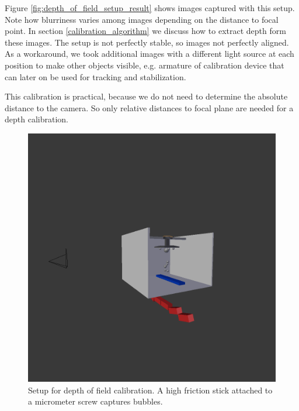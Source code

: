 			Figure \ref{fig:depth_of_field_setup_result} shows images captured with this setup. Note how blurriness varies among images depending on the distance to focal point. In section \ref{calibration_algorithm} we discuss how to extract depth form these images. The setup is not perfectly stable, so images not perfectly aligned. As a workaround, we took additional images with a different light source at each position to make other objects visible, e.g. armature of calibration device that can later on be used for tracking and stabilization. 
			
			This calibration is practical, because we do not need to determine the absolute distance to the camera. So only relative distances to focal plane are needed for a depth calibration. 
			
			
			\begin{figure}
				\centering
				\includegraphics[scale=.2]{images/depth_of_field_setup.png}
				\caption{Setup for depth of field calibration. A high friction stick attached to a micrometer screw captures bubbles. }
				\label{fig:depth_of_field_setup}
			\end{figure}
			
